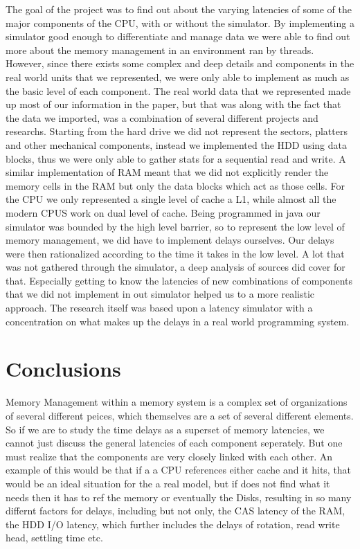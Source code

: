 \documentclass[12pt]{article}
\newcommand{\singlespace}{
  \protect\renewcommand\baselinestretch{1.0}
  \protect\normalsize
}
\begin{document}
The goal of the project was to find out about the varying latencies of some of the major components of the CPU, with
or without the simulator. By implementing a simulator good enough to differentiate and manage data we were able to
find out more about the memory management in an environment ran by threads. However, since there exists some complex
and deep details and components in the real world units that we represented, we were only able to implement as much
as the basic level of each component.
The real world data that we represented made up most of our information in the paper, but that was along with the
fact that the data we imported, was a combination of several different projects and researchs.
Starting from the hard drive we did not represent the sectors, platters and other mechanical components, instead
we implemented the HDD using data blocks, thus we were only able to gather stats for a sequential read and write.
A similar implementation of RAM meant that we did not explicitly render the memory cells in the RAM but only the
data blocks which act as those cells.
For the CPU we only represented a single level of cache a L1, while almost all the modern CPUS work on dual level
of cache.
Being programmed in java our simulator was bounded by the high level barrier, so to represent the low
level of memory management, we did have to implement delays ourselves. Our delays were then rationalized according
to the time it takes in the low level. 
A lot that was not gathered through the simulator, a deep analysis of sources did cover for that. Especially getting
to know the latencies of new combinations of components that we did not implement in out simulator helped us to a
more realistic approach. The research itself was based upon a latency simulator with a concentration on what makes
up the delays in a real world programming system. 


\section{Conclusions} 

\label{sec:conclusions}

Memory Management within a memory system is a complex set of organizations of several different peices, which
themselves are a set of several different elements. So if we are to study the time delays as a superset of
memory latencies, we cannot just discuss the general latencies of each component seperately. But one must
realize that the components are very closely linked with each other. An example of this would be that if a
a CPU references either  cache and it hits, that would be an ideal situation for the a real model, but if does
not find what it needs then it has to ref the memory or eventually the Disks, resulting in so many differnt
factors for delays, including but not only, the CAS latency of the RAM, the HDD I/O latency, which further
includes the delays of rotation, read write head, settling time etc.


\singlespace



\end{document}
